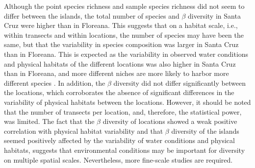\documentclass[jmse,article,accept,moreauthors,pdftex]{Definitions/mdpi}
\begin{document}
\begin{paracol}{2}
Although the point species richness and sample species richness did not seem to differ between the islands, the total number of species and $\beta$ diversity in Santa Cruz were higher than in Floreana. This suggests that on a habitat scale, i.e., within transects and within locations, the number of species may have been the same, but that the variability in species composition was larger in Santa Cruz than in Floreana. This is expected as the variability in observed water conditions and physical habitats of the different locations was also higher in Santa Cruz than in Floreana, and more different niches are more likely to harbor more different species \citep{Elith2009,Guisan2000}. In addition, the $\beta$ diversity did not differ significantly between the locations, which corroborates the absence of significant differences in the variability of physical habitats between the locations. However, it should be noted that the number of transects per location, and, therefore, the statistical power, was limited. The fact that the $\beta$ diversity of locations showed a weak positive correlation with physical habitat variability and that $\beta$ diversity of the islands seemed positively affected by the variability of water conditions and physical habitats, suggests that environmental conditions may be important for diversity on multiple spatial scales. Nevertheless, more fine-scale studies are required.


\end{paracol}
\end{document}
